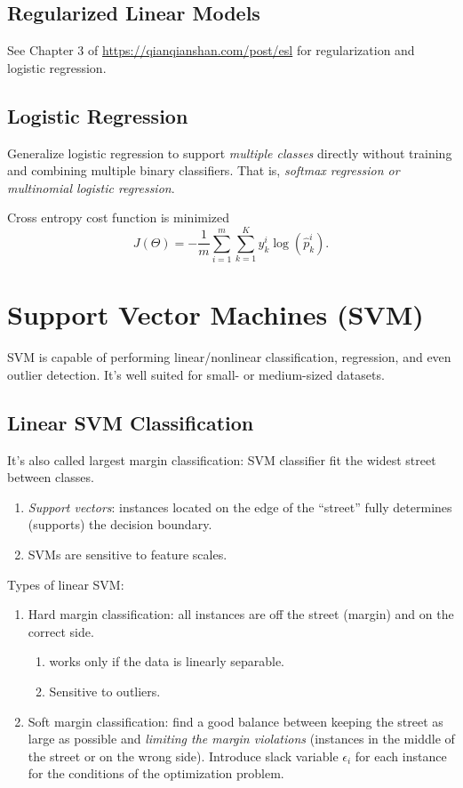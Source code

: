 \documentclass[12pt,oneside,a4paper]{article}
\numberwithin{equation}{section}
\begin{document}
\subsection{Regularized Linear Models}
See Chapter 3 of \href{https://qianqianshan.com/post/elementsofstatisticallearning/}{https://qianqianshan.com/post/esl} for regularization and logistic regression.


\subsection{Logistic Regression}
Generalize logistic regression to support \emph{multiple classes} directly without training and combining multiple binary classifiers. That is, \emph{softmax regression or multinomial logistic regression}.

Cross entropy cost function is minimized 
\begin{equation}
J(\Theta) = - \frac{1}{m} \sum_{i=1}^{m} \sum_{k=1}^{K} y_k^{i} \log (\hat{p}_k^i).
\end{equation}

\section{Support Vector Machines (SVM)}
SVM is capable of performing linear/nonlinear classification, regression, and even outlier detection. It's well suited for small- or medium-sized datasets.
\subsection{Linear SVM Classification}
It's also called largest margin classification: SVM classifier fit the widest street between classes.

\begin{enumerate}
\item \emph{Support vectors}: instances located on the edge of the ``street'' fully determines (supports) the decision boundary. 
\item SVMs are sensitive to feature scales. 
\end{enumerate}
Types of linear SVM:
\begin{enumerate}
\item Hard margin classification: all instances are off the street (margin) and on the correct side. 
\begin{enumerate}
\item works only if the data is linearly separable.
\item Sensitive to outliers.
\end{enumerate}

\item Soft margin classification: find a good balance between keeping the street as large as possible and \emph{limiting the margin violations} (instances in the middle of the street or on the wrong side). Introduce slack variable $\epsilon_i$ for each instance for the conditions of the optimization problem.
\end{enumerate}
\end{document}
